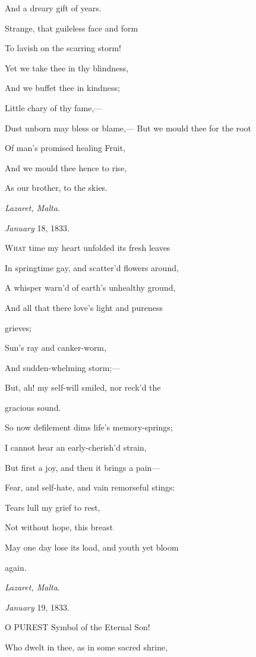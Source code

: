 And a dreary gift of years.

Strange, that guileless face and form

To lavish on the scarring storm!

Yet we take thee in thy blindness,

And we buffet thee in kindness;

Little chary of thy fame,—

Dust unborn may bless or blame,— But we mould thee for the root

Of man's promised healing Fruit,

And we mould thee hence to rise,

As our brother, to the skies.

\emph{Lazaret, Malta}.

\emph{January} 18, 1833.


W\textsc{hat} time my heart unfolded its fresh leaves

In springtime gay, and scatter'd flowers around,

A whisper warn'd of earth's unhealthy ground,

And all that there love's light and pureness

grieves;

Sun's ray and canker-worm,

And sudden-whelming storm;—

But, ah! my self-will smiled, nor reck'd the

gracious sound.

So now defilement dims life's memory-springs;

I cannot hear an early-cherish'd strain,

But first a joy, and then it brings a pain—

Fear, and self-hate, and vain remorseful stings:

Tears lull my grief to rest,

Not without hope, this breast

May one day lose its load, and youth yet bloom

again.

\emph{Lazaret, Malta}.

\emph{January} 19, 1833.


O PUREST Symbol of the Eternal Son!

Who dwelt in thee, as in some sacred shrine,

